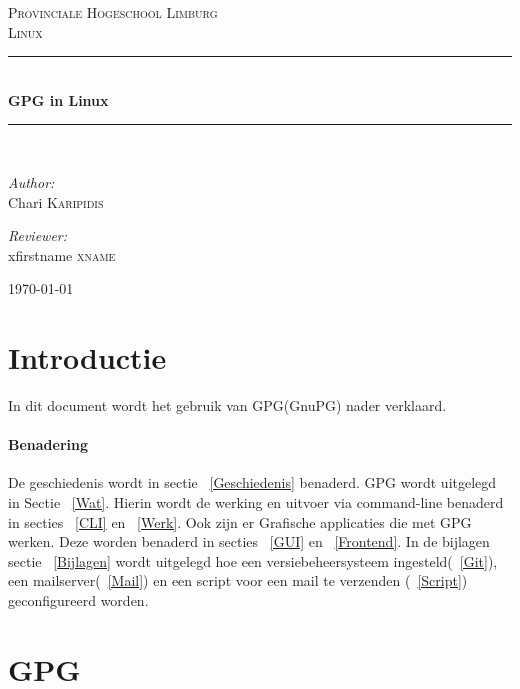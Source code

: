\documentclass[12pt]{article}
\newcommand{\HRule}{\rule{\linewidth}{0.2mm}}
\begin{document}
	\begin{titlepage}
		\begin{center}
			\textsc{\LARGE Provinciale Hogeschool Limburg}\\[1.5cm]
			\textsc{\large Linux}\\[0.5cm]
			\HRule \\[0.4cm]
			{\huge \bfseries GPG in Linux}\\[0.4cm]
			\HRule \\[1.5cm]
			
			\begin{minipage}{0.4\textwidth}
			\begin{flushleft} \large
			\emph{Author:}\\
			Chari \textsc{Karipidis} 
			\end{flushleft}
			\end{minipage}
			\begin{minipage}{0.4\textwidth}
			\begin{flushright} \large
			\emph{Reviewer:}\\
			xfirstname \textsc{xname} 
			\end{flushright}
			\end{minipage}
			\vfill
			{\large \today}
		\end{center}
	\end{titlepage}

	\newpage
	\tableofcontents
	
	\newpage
		\section{Introductie}
			In dit document wordt het gebruik van GPG(GnuPG) nader verklaard.

		\paragraph{Benadering}
			De geschiedenis wordt in sectie ~\ref{Geschiedenis} benaderd.
			GPG wordt uitgelegd in Sectie ~\ref{Wat}.
			Hierin wordt de werking en uitvoer via command-line benaderd in secties ~\ref{CLI} en ~\ref{Werk}.
			Ook zijn er Grafische applicaties die met GPG werken. Deze worden benaderd in secties ~\ref{GUI} en ~\ref{Frontend}.
			In de bijlagen sectie ~\ref{Bijlagen} wordt uitgelegd hoe een versiebeheersysteem ingesteld(~\ref{Git}), een mailserver(~\ref{Mail}) 
			en een script voor een mail te verzenden (~\ref{Script}) geconfigureerd worden.
			

		\newpage
		\section{GPG}\label{GPG}
\end{document}
